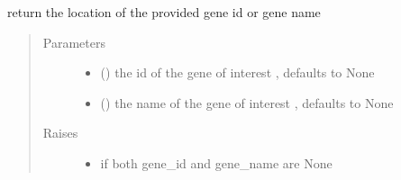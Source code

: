 \documentclass[letterpaper,10pt,english]{sphinxmanual}
\begin{document}
\begin{fulllineitems}
\begin{fulllineitems}
\begin{quote}
\begin{description}
\begin{itemize}
\end{itemize}

\end{description}\end{quote}

\end{fulllineitems}


\begin{fulllineitems}
\label{\detokenize{IPTK.Classes:IPTK.Classes.Database.CellularLocationDB.get_approved_location}}
return the location of the provided gene id or gene name
\begin{quote}\begin{description}
\item[{Parameters}] \leavevmode\begin{itemize}
\item {} 
 (\sphinxstyleliteralemphasis{\sphinxupquote{, }}) \textendash{} the id of the gene of interest , defaults to None

\item {} 
 (\sphinxstyleliteralemphasis{\sphinxupquote{{[}}}\sphinxstyleliteralemphasis{\sphinxupquote{{]}}}\sphinxstyleliteralemphasis{\sphinxupquote{, }}) \textendash{} the name of the gene of interest , defaults to None

\end{itemize}

\item[{Raises}] \leavevmode\begin{itemize}
\item {} 
 \textendash{} if both gene\_id and gene\_name are None


\end{itemize}
\end{description}
\end{quote}
\end{fulllineitems}
\end{fulllineitems}
\end{document}
